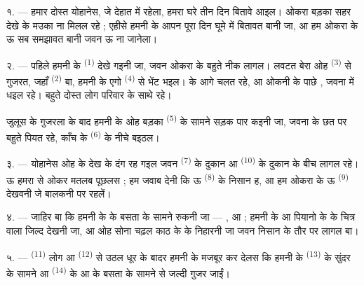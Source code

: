 \VUsaut{4.0mm}
\VUsaut{3.0mm}

\VUsaut{3.0mm}

१. --- हमार दोस्त योहानेस, जे देहात में रहेला, हमरा घरे तीन दिन बितावे
आइल।  ओकरा बड़का सहर देखे के मउका ना मिलल रहे ;
एहीसे हमनी के आपन पूरा दिन घूमे में बितावत बानी जा, आ हम ओकरा के ऊ सब
समझावत बानी जवन ऊ ना जानेला।

२. --- पहिले हमनी के  \textsuperscript{(1)} देखे गइनी जा,
जवन ओकरा के बहुते नीक लागल। लवटत बेरा ओह  \textsuperscript{(3)}
से गुजरत, जहाँ  \textsuperscript{(2)} बा, हमनी के एगो
 \textsuperscript{(4)} से भेंट भइल।  के आगे
 चलत रहे, आ ओकनी के पाछे , जवना
में  धइल रहे। बहुते दोस्त लोग 
परिवार के साथे रहे।

जुलूस के गुजरला के बाद हमनी के ओह बड़का 
\textsuperscript{(5)} के सामने सड़क पार कइनी जा, जवना के छत पर बहुते
  पियत रहे, काँच के 
\textsuperscript{(6)} के नीचे बइठल।

३. --- योहानेस ओह  के देख के दंग रह गइल जवन  \textsuperscript{(7)} के दुकान आ 
\textsuperscript{(10)} के दुकान के बीच लागल रहे। ऊ हमरा से ओकर मतलब
पूछलस ; हम जवाब देनी कि ऊ  \textsuperscript{(8)}
के निसान ह, आ हम ओकरा के ऊ  \textsuperscript{(9)} देखवनी जे
बालकनी पर रहलें।

\VUsaut{3.0mm}

४. --- जाहिर बा कि हमनी के  के बसता के सामने रुकनी जा —
,  आ  ; हमनी के
 आ पियानो के  के चित्र वाला जिल्द देखनी जा,
आ ओह सोना चढ़ल काठ के  के निहारनी जा जवन निसान के तौर पर
लागल बा।

५. ---  \textsuperscript{(11)} लोग आ  \textsuperscript{(12)} से उठल धूर के बादर हमनी के मजबूर कर देलस कि
हमनी के  \textsuperscript{(13)} के सुंदर
 के सामने आ  \textsuperscript{(14)} के
 आ  के बसता के सामने से जल्दी गुजर जाईं।

